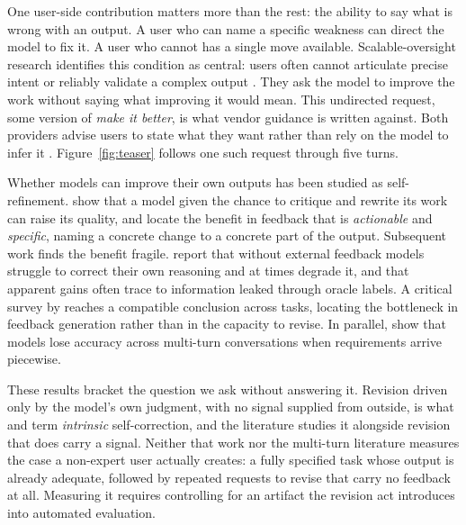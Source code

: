 One user-side contribution matters more than the rest: the ability to say what is wrong
with an output. A user who can name a specific weakness can direct the model to fix it. A
user who cannot has a single move available. Scalable-oversight research
identifies this condition as central: users often cannot articulate precise intent or
reliably validate a complex output \cite{zhou2026oversight}. They ask
the model to improve the work without saying what improving it would mean. This undirected
request, some version of \emph{make it better}, is what vendor guidance is written
against. Both providers advise users to state what they want rather than rely on the model
to infer it \cite{openai2025prompting, anthropic2025prompting}.
Figure~\ref{fig:teaser} follows one such request through five turns.

Whether models can improve their own outputs has been studied as self-refinement.
\citet{madaan2024self} show that a model given the chance to critique and rewrite its work
can raise its quality, and locate the benefit in feedback that is \emph{actionable} and
\emph{specific}, naming a concrete change to a concrete part of the output. Subsequent work
finds the benefit fragile. \citet{huang2024large} report that without external feedback
models struggle to correct their own reasoning and at times degrade it, and that apparent
gains often trace to information leaked through oracle labels. A critical survey by
\citet{kamoi2024selfcorrection} reaches a compatible conclusion across tasks, locating the
bottleneck in feedback generation rather than in the capacity to revise. In parallel,
\citet{laban2025lost} show that models lose accuracy across multi-turn conversations when
requirements arrive piecewise.

These results bracket the question we ask without answering it. Revision driven only by the
model's own judgment, with no signal supplied from outside, is what
\citet{kamoi2024selfcorrection} and \citet{huang2024large} term \emph{intrinsic}
self-correction, and the literature studies it alongside revision that does carry a signal.
Neither that work nor the multi-turn literature measures the case a non-expert user
actually creates: a fully specified task whose output is already adequate, followed by
repeated requests to revise that carry no feedback at all. Measuring it requires
controlling for an artifact the revision act introduces into automated evaluation.


